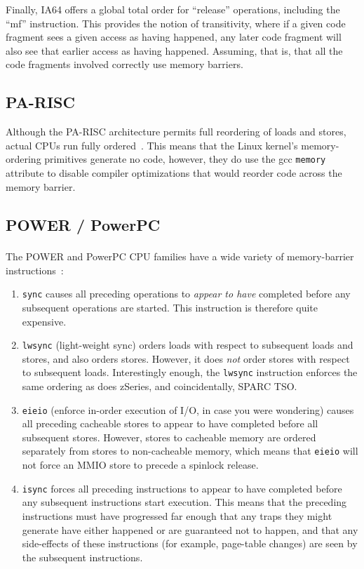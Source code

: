 Finally, IA64 offers a global total order for ``release'' operations,
including the ``mf'' instruction.
This provides the notion of transitivity, where if a given code fragment
sees a given access as having happened, any later code fragment will
also see that earlier access as having happened.
Assuming, that is, that all the code fragments involved correctly use
memory barriers.

\subsection{PA-RISC}

Although the PA-RISC architecture permits full reordering of loads and
stores, actual CPUs run fully ordered~\cite{GerryKane96a}.
This means that the Linux kernel's memory-ordering primitives generate
no code, however, they do use the gcc {\tt memory} attribute to disable
compiler optimizations that would reorder code across the memory
barrier.

\subsection{POWER / PowerPC}
\label{sec:app:whymb:POWER / PowerPC}

The POWER and PowerPC\textsuperscript{\textregistered}
CPU families have a wide variety of memory-barrier
instructions~\cite{PowerPC94,MichaelLyons02a}:
\begin{enumerate}
\item	{\tt sync} causes all preceding operations to {\em appear to have}
	completed before any subsequent operations are started.
	This instruction is therefore quite expensive.
\item	{\tt lwsync} (light-weight sync) orders loads with respect to
	subsequent loads and stores, and also orders stores.
	However, it does {\em not} order stores with respect to subsequent
	loads.
	Interestingly enough, the {\tt lwsync} instruction enforces
	the same ordering as does zSeries, and coincidentally,
	SPARC TSO.
\item	{\tt eieio} (enforce in-order execution of I/O, in case you
	were wondering) causes all preceding cacheable stores to appear
	to have completed before all subsequent stores.
	However, stores to cacheable memory are ordered separately from
	stores to non-cacheable memory, which means that {\tt eieio}
	will not force an MMIO store to precede a spinlock release.
\item	{\tt isync} forces all preceding instructions to appear to have
	completed before any subsequent instructions start execution.
	This means that the preceding instructions must have progressed
	far enough that any traps they might generate have either happened
	or are guaranteed not to happen, and that any side-effects of
	these instructions (for example, page-table changes) are seen by the
	subsequent instructions.
\end{enumerate}

